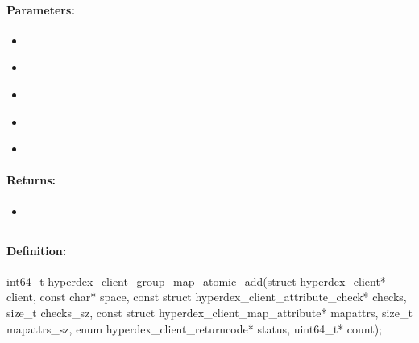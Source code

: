 \paragraph{Parameters:}
\begin{itemize}[noitemsep]
\item {}\\

\item {}\\

\item {}\\

\item {}\\

\item {}\\

\end{itemize}

\paragraph{Returns:}
\begin{itemize}[noitemsep]
\item {}\\

\end{itemize}

\pagebreak
\subsection{}
\label{api:c:group_map_atomic_add}


\paragraph{Definition:}
\begin{ccode}
int64_t hyperdex_client_group_map_atomic_add(struct hyperdex_client* client,
        const char* space,
        const struct hyperdex_client_attribute_check* checks, size_t checks_sz,
        const struct hyperdex_client_map_attribute* mapattrs, size_t mapattrs_sz,
        enum hyperdex_client_returncode* status,
        uint64_t* count);
\end{ccode}

